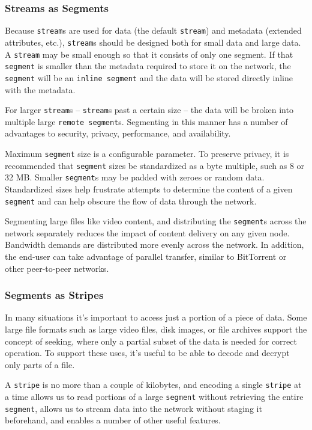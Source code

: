 \documentclass[a4paper,10pt]{article} \usepackage[utf8]{inputenc}
\newcommand{\x}[1]{{\tt #1}} \newcommand{\code}[1]{{\tt #1}}
\begin{document}
\subsubsection{Streams as Segments}

Because \x{stream}s are used for data (the default \x{stream}) and metadata
(extended attributes, etc.), \x{stream}s should be designed both for small data
and large data. 
A \x{stream} may be small enough so that it consists of only one segment.
If that \x{segment} is smaller than the metadata required to store it on the network, the \x{segment} will be an \x{inline
segment} and the data will be stored directly inline with the metadata.

For larger \x{stream}s -- \x{stream}s past a certain size -- the data will be broken into
multiple large \x{remote segment}s. Segmenting in this manner has a number of
advantages to security, privacy, performance, and availability.

Maximum \x{segment} size is a configurable parameter. To preserve privacy, it is
recommended that \x{segment} sizes be standardized as a byte multiple, such as 8
or 32 MB. Smaller \x{segment}s may be padded with zeroes or random data.
Standardized sizes help frustrate attempts to determine the content of a given
\x{segment} and can help obscure the flow of data through the network.

Segmenting large files like video content, and distributing the \x{segment}s
across the network separately reduces the impact of content delivery on any
given node. 
Bandwidth demands are distributed more evenly across the network. 
In addition, the end-user can take advantage of parallel transfer, similar to
BitTorrent or other peer-to-peer networks.

\subsubsection{Segments as Stripes}

In many situations it's important to access just a portion of a piece of
data. Some large file formats such as large video files, disk images, or file
archives support the concept of seeking, 
where only a partial subset of the data is needed for correct operation. 
To support these uses, 
it's useful to be able to decode and decrypt only parts of a file.

A \x{stripe} is no more than a couple of kilobytes, and encoding a single
\x{stripe} at a time allows us to read portions of a large \x{segment}
without retrieving the entire \x{segment}, allows us to stream data into the
network without staging it beforehand, and enables a number of other useful
features.
\end{document}
